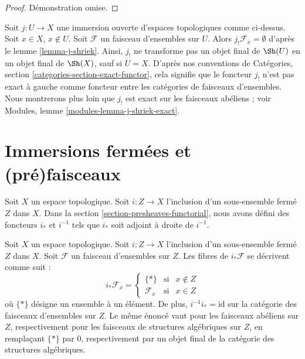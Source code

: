 \begin{proof}
Démonstration omise.
\end{proof}

\begin{remark}
\label{remark-j-shriek-not-exact}
Soit $j : U \to X$ une immersion ouverte d'espaces topologiques comme ci-dessus.
Soit $x \in X$, $x \not \in U$. Soit $\mathcal{F}$ un faisceau d'ensembles
sur $U$. Alors $j_!\mathcal{F}_x = \emptyset$ d'après le lemme \ref{lemma-j-shriek}.
Ainsi, $j_!$ ne transforme pas un objet final de $\Sh(U)$
en un objet final de $\Sh(X)$, sauf si $U = X$.
D'après nos conventions de
Catégories, section \ref{categories-section-exact-functor},
cela signifie que le foncteur $j_!$ n'est pas exact à gauche
comme foncteur entre les catégories de faisceaux d'ensembles.
Nous montrerons plus loin que $j_!$ est exact sur les faisceaux abéliens ;
voir Modules, lemme \ref{modules-lemma-j-shriek-exact}.
\end{remark}







\section{Immersions fermées et (pré)faisceaux}
\label{section-closed-immersions}

\noindent
Soit $X$ un espace topologique.
Soit $i : Z \to X$ l'inclusion d'un sous-ensemble fermé $Z$ dans $X$.
Dans la section \ref{section-presheaves-functorial}, nous avons défini
des foncteurs $i_*$ et $i^{-1}$ tels que $i_*$ soit adjoint à droite de
$i^{-1}$.

\begin{lemma}
\label{lemma-stalks-closed-pushforward}
Soit $X$ un espace topologique.
Soit $i : Z \to X$ l'inclusion d'un sous-ensemble fermé $Z$ dans $X$.
Soit $\mathcal{F}$ un faisceau d'ensembles sur $Z$.
Les fibres de $i_*\mathcal{F}$ se décrivent comme suit :
$$
i_*\mathcal{F}_x =
\left\{
\begin{matrix}
\{*\} & \text{si} & x \not \in Z \\
\mathcal{F}_x & \text{si} & x \in Z
\end{matrix}
\right.
$$
où $\{*\}$ désigne un ensemble à un élément. De plus,
$i^{-1}i_* = \text{id}$ sur la catégorie des faisceaux
d'ensembles sur $Z$. Le même énoncé vaut pour les faisceaux
abéliens sur $Z$, respectivement pour les faisceaux de structures
algébriques sur $Z$, en remplaçant $\{*\}$ par $0$, respectivement
par un objet final de la catégorie des structures algébriques.
\end{lemma}

